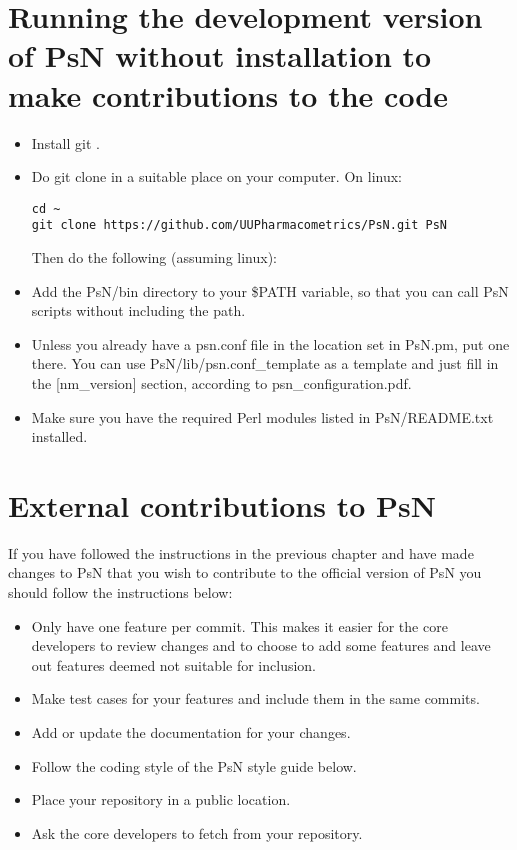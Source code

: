 \section{Running the development version of PsN without installation to make contributions to the code}
\begin{itemize}
\item Install git \cite{git}. 
\item Do git clone in a suitable place on your computer. On linux:
\begin{verbatim}
cd ~
git clone https://github.com/UUPharmacometrics/PsN.git PsN

\end{verbatim}
\noindent Then do the following (assuming linux):
\item Add the PsN/bin directory to your \$PATH variable, so that you can call PsN scripts without including the path.
\item Unless you already have a psn.conf file in the location set in PsN.pm, put one there. 
You can use PsN/lib/psn.conf\_template as a template and just fill in the [nm\_version] section,
according to psn\_configuration.pdf.
\item Make sure you have the required Perl modules listed in PsN/README.txt installed.
\end{itemize}

\section{External contributions to PsN}
If you have followed the instructions in the previous chapter and have made changes to PsN that you wish to contribute
to the official version of PsN you should follow the instructions below:

\begin{itemize}
    \item Only have one feature per commit. This makes it easier for the core developers to review changes and to choose to add some features and leave out features deemed not suitable for inclusion.
    \item Make test cases for your features and include them in the same commits.
    \item Add or update the documentation for your changes.
    \item Follow the coding style of the PsN style guide below.
    \item Place your repository in a public location.
    \item Ask the core developers to fetch from your repository.
\end{itemize}

